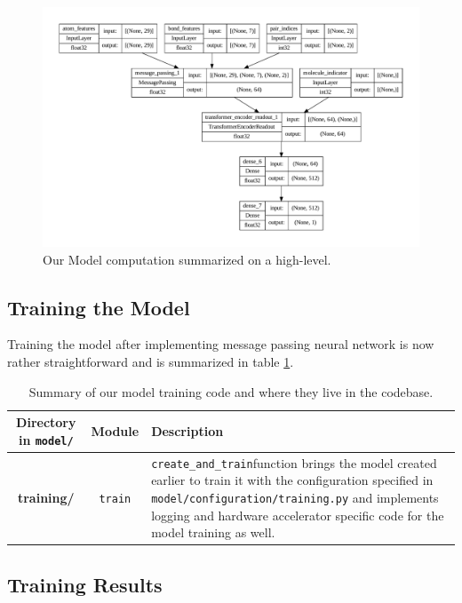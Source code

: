 \documentclass[fontsize=11pt]{article}
\begin{document}
\begin{figure}[htbp]
    \centering
    \includegraphics[width=\textwidth]{computation.pdf}
    \caption{Our Model computation summarized on a high-level.}
    \label{fig:computation}
\end{figure}

\subsection*{Training the Model}

Training the model after implementing message passing neural network is now rather straightforward and is summarized in table \ref{tab:train}.

\begin{table}[ht]
\centering
\caption{Summary of our model training code and where they live in the codebase.}
\label{tab:train}
\begin{tabularx}{\textwidth}{ccX}
\toprule
\textbf{Directory in \texttt{model/}} & \textbf{Module} & \textbf{Description}\\
\midrule
\multirow{3}{*}{\textbf{training/}} & \texttt{train} &\texttt{create\_and\_train}function brings the model created earlier to train it with the configuration specified in \texttt{model/configuration/training.py} and implements logging and hardware accelerator specific code for the model training as well.\\
\bottomrule
\end{tabularx}
\end{table}

\subsection*{Training Results}
\end{document}
